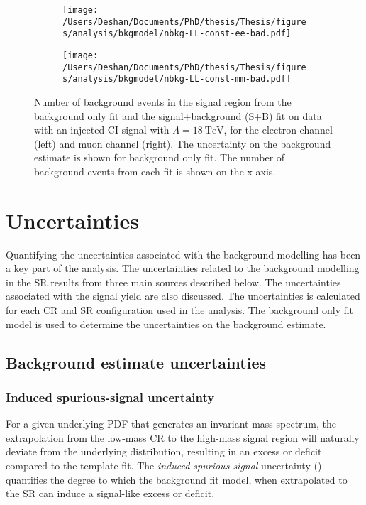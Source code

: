 \begin{figure}[h!]
    \centering
    \begin{subfigure}[b]{0.49\textwidth}
        \centering
        \texttt{[image: /Users/Deshan/Documents/PhD/thesis/Thesis/figures/analysis/bkgmodel/nbkg-LL-const-ee-bad.pdf]}
        \label{fig:bkgmodel:fitsbplusb1bad}
    \end{subfigure}
    \begin{subfigure}[b]{0.49\textwidth}
        \centering
        \texttt{[image: /Users/Deshan/Documents/PhD/thesis/Thesis/figures/analysis/bkgmodel/nbkg-LL-const-mm-bad.pdf]}
        \label{fig:bkgmodel:fitsbplusb2bad}
    \end{subfigure}
    \caption[Background estimation comparisons of the signal+background fit and background only fit in an invalid CR choice.]{Number of background events in the signal region from the background only fit and the signal+background (S+B) fit on data with an injected CI signal with $\Lambda = \SI{18}{\tera\electronvolt}$, for the electron channel (left) and muon channel (right). The uncertainty on the background estimate is shown for background only fit. The number of background events from each fit is shown on the x-axis.}
    \label{fig:bkgmodel:fitsbplusbbad}
\end{figure}

\section{Uncertainties}\label{sec:extrap:uncertainties}
Quantifying the uncertainties associated with the background modelling has been a key part of the analysis. The uncertainties related to the background modelling in the SR results from three main sources described below. The uncertainties associated with the signal yield are also discussed. The uncertainties is calculated for each CR and SR configuration used in the analysis. The background only fit model is used to determine the uncertainties on the background estimate. 

\subsection{Background estimate uncertainties}

\subsubsection{Induced spurious-signal uncertainty}
For a given underlying PDF that generates an invariant mass spectrum, the extrapolation from the low-mass CR to the high-mass signal region will naturally deviate from the underlying distribution, resulting in an excess or deficit compared to the template fit. The \emph{induced spurious-signal} uncertainty (\ISSU) quantifies the degree to which the background fit model, when extrapolated to the SR can induce a signal-like excess or deficit. 

